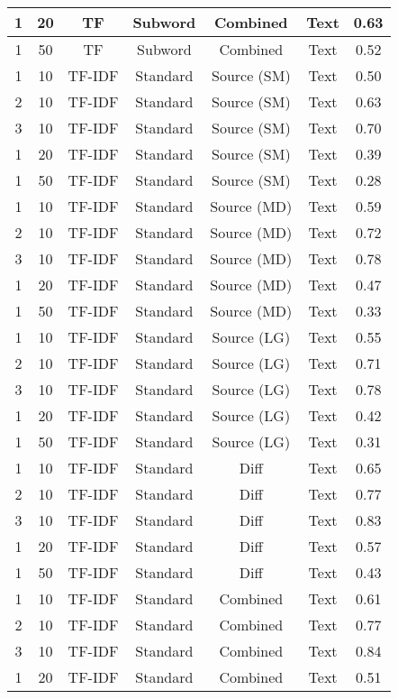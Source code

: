 \begin{longtable}{|c|c|c|c|c|c|c|}
\hline
1 & 20 & TF & Subword & Combined & Text & 0.63 \\
\hline
1 & 50 & TF & Subword & Combined & Text & 0.52 \\
\hline
1 & 10 & TF-IDF & Standard & Source (SM) & Text & 0.50 \\
\hline
2 & 10 & TF-IDF & Standard & Source (SM) & Text & 0.63 \\
\hline
3 & 10 & TF-IDF & Standard & Source (SM) & Text & 0.70 \\
\hline
1 & 20 & TF-IDF & Standard & Source (SM) & Text & 0.39 \\
\hline
1 & 50 & TF-IDF & Standard & Source (SM) & Text & 0.28 \\
\hline
1 & 10 & TF-IDF & Standard & Source (MD) & Text & 0.59 \\
\hline
2 & 10 & TF-IDF & Standard & Source (MD) & Text & 0.72 \\
\hline
3 & 10 & TF-IDF & Standard & Source (MD) & Text & 0.78 \\
\hline
1 & 20 & TF-IDF & Standard & Source (MD) & Text & 0.47 \\
\hline
1 & 50 & TF-IDF & Standard & Source (MD) & Text & 0.33 \\
\hline
1 & 10 & TF-IDF & Standard & Source (LG) & Text & 0.55 \\
\hline
2 & 10 & TF-IDF & Standard & Source (LG) & Text & 0.71 \\
\hline
3 & 10 & TF-IDF & Standard & Source (LG) & Text & 0.78 \\
\hline
1 & 20 & TF-IDF & Standard & Source (LG) & Text & 0.42 \\
\hline
1 & 50 & TF-IDF & Standard & Source (LG) & Text & 0.31 \\
\hline
1 & 10 & TF-IDF & Standard & Diff & Text & 0.65 \\
\hline
2 & 10 & TF-IDF & Standard & Diff & Text & 0.77 \\
\hline
3 & 10 & TF-IDF & Standard & Diff & Text & 0.83 \\
\hline
1 & 20 & TF-IDF & Standard & Diff & Text & 0.57 \\
\hline
1 & 50 & TF-IDF & Standard & Diff & Text & 0.43 \\
\hline
1 & 10 & TF-IDF & Standard & Combined & Text & 0.61 \\
\hline
2 & 10 & TF-IDF & Standard & Combined & Text & 0.77 \\
\hline
3 & 10 & TF-IDF & Standard & Combined & Text & 0.84 \\
\hline
1 & 20 & TF-IDF & Standard & Combined & Text & 0.51 \\

\end{longtable}
